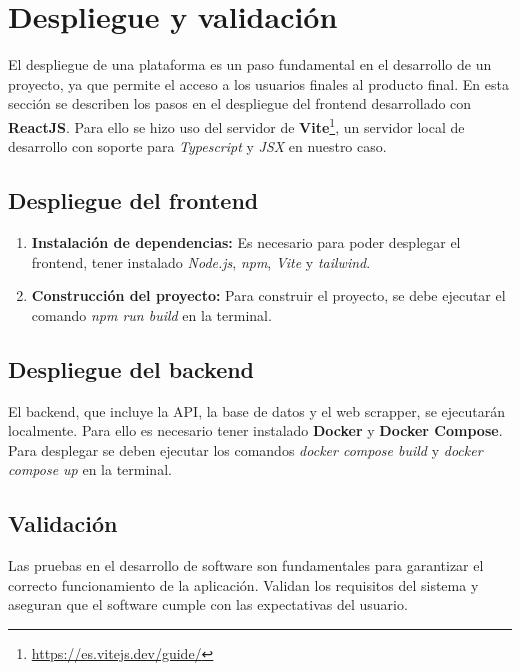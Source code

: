 \chapter{Despliegue y validación}

El despliegue de una plataforma es un paso fundamental en el desarrollo de un proyecto, ya que permite el acceso a los usuarios finales al producto final. En esta sección se describen los pasos en el despliegue del frontend desarrollado con \textbf{ReactJS}. Para ello se hizo uso del servidor de \textbf{Vite}\footnote{\url{https://es.vitejs.dev/guide/}}, un servidor local de desarrollo con soporte para \textit{Typescript} y \textit{JSX} en nuestro caso.

\section{Despliegue del frontend}

\begin{enumerate}
    \item \textbf{Instalación de dependencias:} Es necesario para poder desplegar el frontend, tener instalado \textit{Node.js}, \textit{npm}, \textit{Vite} y \textit{tailwind}.
    \item \textbf{Construcción del proyecto:} Para construir el proyecto, se debe ejecutar el comando \textit{npm run build} en la terminal.
\end{enumerate}

\section{Despliegue del backend}

El backend, que incluye la API, la base de datos y el web scrapper, se ejecutarán localmente. Para ello es necesario tener instalado \textbf{Docker} y \textbf{Docker Compose}. Para desplegar se deben ejecutar los comandos \textit{docker compose build} y \textit{docker compose up} en la terminal.

\newpage
\section{Validación}

Las pruebas en el desarrollo de software son fundamentales para garantizar el correcto funcionamiento de la aplicación. Validan los requisitos del sistema y aseguran que el software cumple con las expectativas del usuario.\newline

